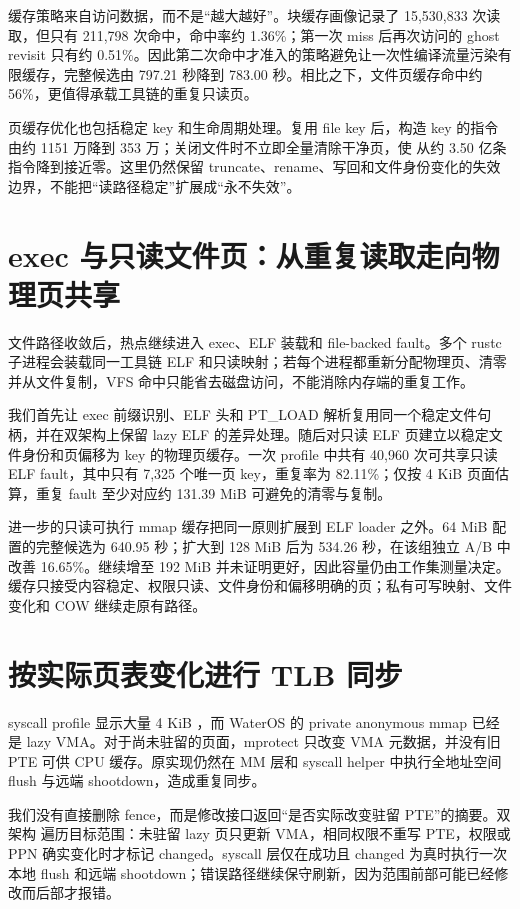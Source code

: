 缓存策略来自访问数据，而不是“越大越好”。块缓存画像记录了 15,530,833 次读取，但只有 211,798 次命中，命中率约 1.36\%；第一次 miss 后再次访问的 ghost revisit 只有约 0.51\%。因此第二次命中才准入的策略避免让一次性编译流量污染有限缓存，完整候选由 797.21 秒降到 783.00 秒。相比之下，文件页缓存命中约 56\%，更值得承载工具链的重复只读页。

页缓存优化也包括稳定 key 和生命周期处理。复用 file key 后，构造 key 的指令由约 1151 万降到 353 万；关闭文件时不立即全量清除干净页，使  从约 3.50 亿条指令降到接近零。这里仍然保留 truncate、rename、写回和文件身份变化的失效边界，不能把“读路径稳定”扩展成“永不失效”。

\section{exec 与只读文件页：从重复读取走向物理页共享}

文件路径收敛后，热点继续进入 exec、ELF 装载和 file-backed fault。多个 rustc 子进程会装载同一工具链 ELF 和只读映射；若每个进程都重新分配物理页、清零并从文件复制，VFS 命中只能省去磁盘访问，不能消除内存端的重复工作。

我们首先让 exec 前缀识别、ELF 头和 PT\_LOAD 解析复用同一个稳定文件句柄，并在双架构上保留 lazy ELF 的差异处理。随后对只读 ELF 页建立以稳定文件身份和页偏移为 key 的物理页缓存。一次 profile 中共有 40,960 次可共享只读 ELF fault，其中只有 7,325 个唯一页 key，重复率为 82.11\%；仅按 4 KiB 页面估算，重复 fault 至少对应约 131.39 MiB 可避免的清零与复制。

进一步的只读可执行 mmap 缓存把同一原则扩展到 ELF loader 之外。64 MiB 配置的完整候选为 640.95 秒；扩大到 128 MiB 后为 534.26 秒，在该组独立 A/B 中改善 16.65\%。继续增至 192 MiB 并未证明更好，因此容量仍由工作集测量决定。缓存只接受内容稳定、权限只读、文件身份和偏移明确的页；私有可写映射、文件变化和 COW 继续走原有路径。

\section{按实际页表变化进行 TLB 同步}

syscall profile 显示大量 4 KiB ，而 WaterOS 的 private anonymous mmap 已经是 lazy VMA。对于尚未驻留的页面，mprotect 只改变 VMA 元数据，并没有旧 PTE 可供 CPU 缓存。原实现仍然在 MM 层和 syscall helper 中执行全地址空间 flush 与远端 shootdown，造成重复同步。

我们没有直接删除 fence，而是修改接口返回“是否实际改变驻留 PTE”的摘要。双架构  遍历目标范围：未驻留 lazy 页只更新 VMA，相同权限不重写 PTE，权限或 PPN 确实变化时才标记 changed。syscall 层仅在成功且 changed 为真时执行一次本地 flush 和远端 shootdown；错误路径继续保守刷新，因为范围前部可能已经修改而后部才报错。

